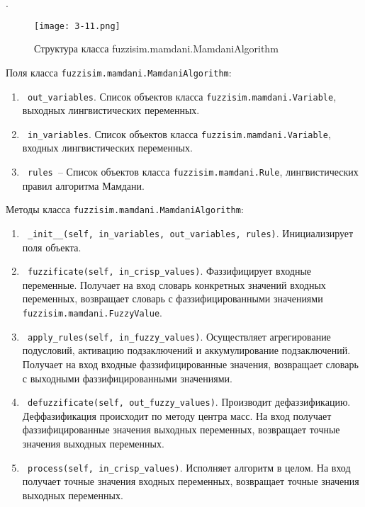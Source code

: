 .

\begin{figure}[ht]
	\centering
	\texttt{[image: 3-11.png]}
	\caption{ Структура класса fuzzisim.mamdani.MamdaniAlgorithm}
\end{figure}

Поля класса \lstinline!fuzzisim.mamdani.MamdaniAlgorithm!:
\begin{enumerate}[label=\arabic*)]
	\item \lstinline! out_variables!. Список объектов класса \lstinline!fuzzisim.mamdani.Variable!, выходных лингвистических переменных.
	\item \lstinline! in_variables!.  Список объектов класса \lstinline!fuzzisim.mamdani.Variable!, входных лингвистических переменных.
	\item \lstinline! rules !– Список объектов класса \lstinline!fuzzisim.mamdani.Rule!, лингвистических правил алгоритма Мамдани.
\end{enumerate}


Методы класса \lstinline!fuzzisim.mamdani.MamdaniAlgorithm!:
\begin{enumerate}[label=\arabic*)]
	\item \lstinline! _init__(self, in_variables, out_variables, rules)!. Инициализирует поля объекта.
	\item \lstinline! fuzzificate(self, in_crisp_values)!. Фаззифицирует входные переменные. Получает на вход словарь конкретных значений входных переменных,  возвращает словарь с фаззифицированными  значениями \lstinline!fuzzisim.mamdani.FuzzyValue!.
	\item \lstinline! apply_rules(self, in_fuzzy_values)!. Осуществляет агрегирование подусловий, активацию подзаключений и аккумулирование подзаключений. Получает на вход входные фаззифицированные значения, возвращает словарь с выходными фаззифицированными значениями.
	\item \lstinline! defuzzificate(self, out_fuzzy_values)!. Производит дефаззификацию. Деффазификация происходит по методу центра масс. На вход получает фаззифицированные значения выходных переменных, возвращает точные значения выходных переменных.
	\item \lstinline! process(self, in_crisp_values)!. Исполняет алгоритм в целом. На вход получает точные значения входных переменных, возвращает точные значения выходных переменных.
\end{enumerate}


